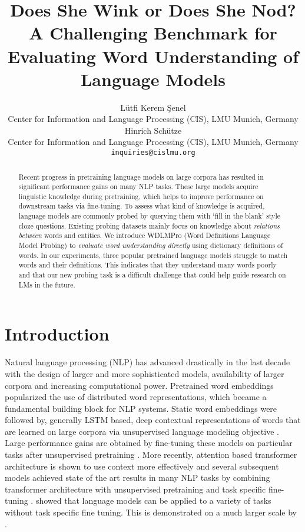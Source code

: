 \documentclass[11pt,a4paper]{article}
\title{Does She Wink or Does She Nod? A Challenging Benchmark for Evaluating Word Understanding of Language Models}
\author{Lütfi Kerem Şenel \\
  Center for Information and Language Processing (CIS), LMU Munich, Germany \\
  Hinrich Schütze \\
    Center for Information and Language Processing (CIS), LMU Munich, Germany \\
  \texttt{inquiries@cislmu.org} \\
  }
\date{}
\begin{document}
\maketitle
\begin{abstract}

Recent progress in pretraining language models on large
corpora has resulted in significant performance gains on many NLP
tasks. These large models acquire linguistic knowledge
during pretraining, which helps to improve
performance on downstream tasks via fine-tuning. To assess
what kind of knowledge is acquired,
language models are commonly probed by querying them with
`fill in the blank' style cloze questions. Existing probing
datasets mainly focus on knowledge about \emph{relations between}
words and entities. We introduce WDLMPro (Word Definitions
Language Model Probing) to \emph{evaluate word understanding
  directly} using dictionary definitions of
words. In our experiments, three popular pretrained
language models
struggle to match words and their  definitions. This
indicates that they understand many words poorly and that
our new probing task is a difficult challenge that could
help guide research on LMs in the future.
\end{abstract}



\section{Introduction}

Natural language processing (NLP)  has advanced drastically
in the last decade with the design of larger and more
sophisticated models, availability of larger
corpora and increasing computational
power. Pretrained word embeddings
\cite{mikolov13word2vec_b, pennington14glove} popularized
the use of distributed word representations, which became a
fundamental building block for NLP systems. Static word
embeddings were followed by, generally LSTM based, deep
contextual representations of words that are learned on
large corpora via unsupervised language modeling objective
\cite{peters18ELMO}. Large performance gains are obtained
by fine-tuning these models on particular tasks after
unsupervised pretraining \cite{radford18fineTuning,
  howard18ULMFiT}. More recently, attention based
transformer architecture is shown to use context more
effectively \cite{vaswani17transformers} and several
subsequent models achieved state of the art results in many
NLP tasks by combining transformer architecture with
unsupervised pretraining and task specific fine-tuning
\cite{devlin19BERT, liu19RoBERTa}. 
showed that language models can be applied to a variety of
tasks without task specific fine tuning. This is demonstrated on a much larger scale by . 
\end{document}
